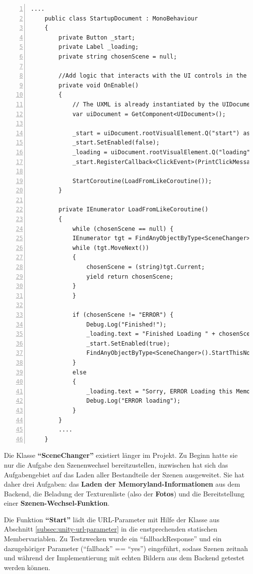 \begin{lstlisting}[numbers=left,caption={StartupDocument für Unity UI Toolkit},label={lst:unity-startup-document}]
....    
    public class StartupDocument : MonoBehaviour
    {
        private Button _start;
        private Label _loading;
        private string chosenScene = null;
           
        //Add logic that interacts with the UI controls in the `OnEnable` methods
        private void OnEnable()
        {
            // The UXML is already instantiated by the UIDocument component
            var uiDocument = GetComponent<UIDocument>();
    
            _start = uiDocument.rootVisualElement.Q("start") as Button;
            _start.SetEnabled(false);
            _loading = uiDocument.rootVisualElement.Q("loading") as Label;
            _start.RegisterCallback<ClickEvent>(PrintClickMessage);
            
            StartCoroutine(LoadFromLikeCoroutine());
        }
    
        private IEnumerator LoadFromLikeCoroutine()
        {
            while (chosenScene == null) {
            IEnumerator tgt = FindAnyObjectByType<SceneChanger>().IsValid();
            while (tgt.MoveNext()) 
            {
                chosenScene = (string)tgt.Current;
                yield return chosenScene;
            }
            }
            
            if (chosenScene != "ERROR") {
                Debug.Log("Finished!");
                _loading.text = "Finished Loading " + chosenScene;
                _start.SetEnabled(true);
                FindAnyObjectByType<SceneChanger>().StartThisNow();
            }
            else 
            {
                _loading.text = "Sorry, ERROR Loading this Memoryland. Possibly Token invalid!";
                Debug.Log("ERROR loading");
            }
        }
        ....
    }        
\end{lstlisting}


Die Klasse \textbf{``SceneChanger''} existiert länger im Projekt. Zu Beginn hatte sie nur die Aufgabe den Szenenwechsel bereitzustellen, inzwischen hat sich das Aufgabengebiet auf das Laden aller Bestandteile der Szenen ausgeweitet. Sie hat daher drei Aufgaben: das \textbf{Laden der Memoryland-Informationen} aus dem Backend, die Beladung der Texturenliste (also der \textbf{Fotos}) und die Bereitstellung einer \textbf{Szenen-Wechsel-Funktion}.

Die Funktion \textbf{``Start''} lädt die URL-Parameter mit Hilfe der Klasse aus Abschnitt \ref{subsec:unity-url-parameter} in die enstprechenden statischen Membervariablen. Zu Testzwecken wurde ein ``fallbackResponse'' und ein dazugehöriger Parameter (``fallback'' == ``yes'') eingeführt, sodass Szenen zeitnah und während der Implementierung mit echten Bildern aus dem Backend getestet werden können.

